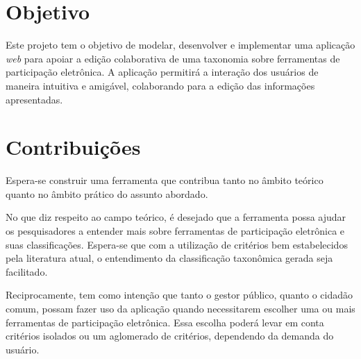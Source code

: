 \section{Objetivo}
\label{sec:objetivo}
Este projeto tem o objetivo de modelar, desenvolver e implementar uma aplicação \textit{web} para apoiar a edição colaborativa de uma taxonomia sobre ferramentas
de participação eletrônica. A aplicação permitirá a interação dos usuários de maneira intuitiva e amigável, colaborando para a edição das informações apresentadas.

\section{Contribuições}
\label{sec:contribuicoes}
Espera-se construir uma ferramenta que contribua tanto no âmbito teórico quanto no âmbito prático do assunto abordado. 
\par
No que diz respeito ao campo teórico, é desejado que a ferramenta possa ajudar os pesquisadores a entender mais sobre ferramentas de participação eletrônica e suas classificações. 
Espera-se que com a utilização de critérios bem estabelecidos pela literatura atual, o entendimento da classificação taxonômica gerada seja facilitado.
\par
Reciprocamente, tem como intenção que tanto o gestor público, quanto o cidadão comum, possam fazer uso da aplicação quando necessitarem escolher uma ou mais ferramentas de participação
eletrônica. Essa escolha poderá levar em conta critérios isolados ou um aglomerado de critérios, dependendo da demanda do usuário.

